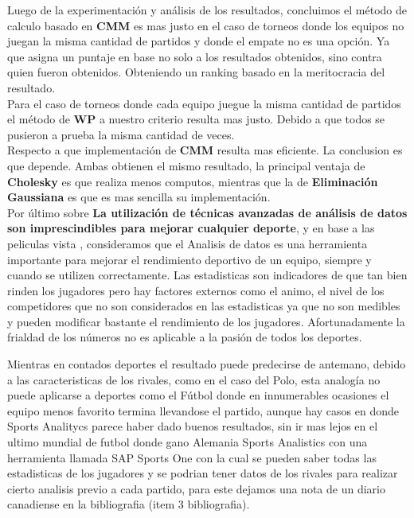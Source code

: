 Luego de la experimentación y análisis de los resultados, concluimos el método de calculo basado en \textbf{CMM} es mas justo en el 
caso de torneos donde los equipos no juegan la misma cantidad de partidos y donde el empate no es una opción. Ya que asigna un puntaje 
en base no solo a los resultados obtenidos, sino contra quien fueron obtenidos. Obteniendo un ranking basado en la meritocracia del resultado. \\

Para el caso de torneos donde cada equipo juegue la misma cantidad de partidos el método de \textbf{WP} a nuestro criterio resulta mas justo. 
Debido a que todos se pusieron a prueba la misma cantidad de veces. \\

Respecto a que implementación de \textbf{CMM} resulta mas eficiente. La conclusion es que depende. Ambas obtienen el mismo resultado, 
la principal ventaja de \textbf{Cholesky} es que realiza menos computos, mientras que la de \textbf{Eliminación Gaussiana} es que es mas 
sencilla su implementación. \\

Por último sobre \textbf{La utilización de técnicas avanzadas de análisis de datos son imprescindibles para mejorar cualquier deporte}, 
 y en base a las peliculas vista , consideramos que el Analisis de datos es una herramienta importante para mejorar el rendimiento deportivo de un equipo, 
siempre y cuando se utilizen correctamente. 
Las estadisticas son indicadores de que tan bien rinden los jugadores pero hay factores externos como el animo, el nivel de los competidores 
que no son considerados en las estadisticas ya que no son medibles y pueden modificar bastante el rendimiento de los jugadores.
Afortunadamente la frialdad de los números no es aplicable a la pasión de todos los deportes. 

Mientras en contados deportes el resultado puede predecirse de antemano, debido a las caracteristicas de los rivales, como en el caso del Polo, 
esta analogía no puede aplicarse a deportes como el Fútbol donde en innumerables ocasiones el equipo menos favorito termina llevandose el partido, aunque hay casos en donde
Sports Analitycs parece haber dado buenos resultados, sin ir mas lejos en el ultimo mundial de futbol donde gano Alemania Sports Analistics
con una herramienta llamada SAP Sports One con la cual se pueden saber todas las estadisticas de los jugadores y se podrian tener datos de los rivales para realizar
cierto analisis previo a cada partido, para este dejamos una nota de un diario canadiense en la bibliografia (item 3 bibliografia).
